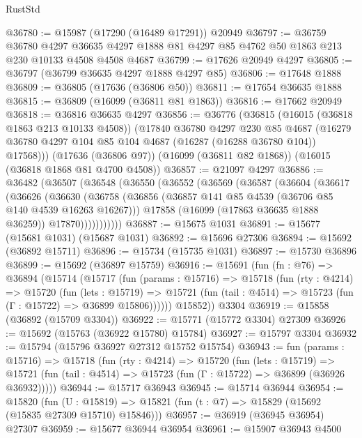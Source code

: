 \begin{lexlean}{RustStd}
\begin{coremodule}
@36780 := @15987 (@17290 (@16489 @17291)) @20949
@36797 := @36759
    @36780
    @4297
    @36635
    @4297
    @1888
    @81
    @4297
    @85
    @4762
    @50
    @1863
    @213
    @230
    @10133
    @4508
    @4508
    @4687
@36799 := @17626 @20949 @4297
@36805 := @36797 (@36799 @36635 @4297 @1888 @4297 @85)
@36806 := @17648 @1888
@36809 := @36805 (@17636 (@36806 @50))
@36811 := @17654 @36635 @1888
@36815 := @36809 (@16099 (@36811 @81 @1863))
@36816 := @17662 @20949
@36818 := @36816 @36635 @4297
@36856 := @36776
    (@36815
      (@16015 (@36818 @1863 @213 @10133 @4508))
      (@17840
        @36780
        @4297
        @230
        @85
        @4687
        (@16279 @36780 @4297 @104 @85 @104 @4687 (@16287 (@16288 @36780 @104)) @17568)))
    (@17636 (@36806 @97))
    (@16099 (@36811 @82 @1868))
    (@16015 (@36818 @1868 @81 @4700 @4508))
@36857 := @21097 @4297
@36886 := @36482
    (@36507
      (@36548
        (@36550
          (@36552
            (@36569
              (@36587
                (@36604
                  (@36617
                    (@36626
                      (@36630
                        (@36758
                          (@36856 (@36857 @141 @85 @4539 (@36706 @85 @140 @4539 @16263 @16267)))
                          @17858
                          (@16099 (@17863 @36635 @1888 @36259))
                          @17870)))))))))))
@36887 := @15675 @1031
@36891 := @15677 (@15681 @1031) (@15687 @1031)
@36892 := @15696 @27306
@36894 := @15692 (@36892 @15711)
@36896 := @15734 (@15735 @1031)
@36897 := @15730 @36896
@36899 := @15692 (@36897 @15759)
@36916 := @15691
    (fun (fn : @76) =>
    @36894
      (@15714
        (@15717
          (fun (params : @15716) =>
          @15718
            (fun (rty : @4214) =>
            @15720
              (fun (lets : @15719) =>
              @15721 (fun (tail : @4514) => @15723 (fun (Γ : @15722) => @36899 @15806))))))
        @15852))
    @3304
@36919 := @15858 (@36892 (@15709 @3304))
@36922 := @15771 (@15772 @3304) @27309
@36926 := @15692 (@15763 (@36922 @15780) @15784)
@36927 := @15797 @3304
@36932 := @15794 (@15796 @36927 @27312 @15752 @15754)
@36943 := fun (params : @15716) =>
  @15718
    (fun (rty : @4214) =>
    @15720
      (fun (lets : @15719) =>
      @15721 (fun (tail : @4514) => @15723 (fun (Γ : @15722) => @36899 (@36926 @36932)))))
@36944 := @15717 @36943
@36945 := @15714 @36944
@36954 := @15820
    (fun (U : @15819) => @15821 (fun (t : @7) => @15829 (@15692 (@15835 @27309 @15710) @15846)))
@36957 := @36919 (@36945 @36954) @27307
@36959 := @15677 @36944 @36954
@36961 := @15907 @36943 @4500

\end{coremodule}
\end{lexlean}
